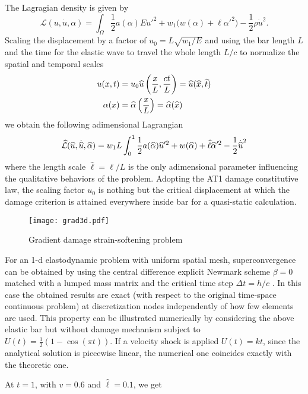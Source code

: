 The Lagragian density is given by
\[
\mathcal{L}(u,\dot{u},\alpha)=\int_\Omega\frac{1}{2}a(\alpha)Eu'^2+w_1\bigl(w(\alpha)+\ell\alpha'^2\bigr)-\frac{1}{2}\rho\dot{u}^2.
\]
Scaling the displacement by a factor of $u_0=L\sqrt{w_1/E}$ and using the bar length $L$ and the time for the elastic wave to travel the whole length $L/c$ to normalize the spatial and temporal scales
\begin{align}
u(x,t) &= u_0\widehat{u}\left(\frac{x}{L},\frac{ct}{L}\right)=\widehat{u}(\widehat{x},\widehat{t}) \label{eq:u} \\
\alpha(x) &= \widehat{\alpha}\left(\frac{x}{L}\right)=\widehat{\alpha}(\widehat{x})
\end{align}
we obtain the following adimensional Lagrangian
\begin{equation}
\widehat{\mathcal{L}}(\widehat{u},\dot{\widehat{u}},\widehat{\alpha})=w_1L\int_0^1\frac{1}{2}a(\widehat{\alpha})\widehat{u}'^2+w(\widehat{\alpha})+\widehat{\ell}\widehat{\alpha}'^2-\frac{1}{2}\dot{\widehat{u}}^2
\end{equation}
where the length scale $\widehat{\ell}=\ell/L$ is the only adimensional parameter influencing the qualitative behaviors of the problem. Adopting the AT1 damage constitutive law, the scaling factor $u_0$ is nothing but the critical displacement at which the damage criterion is attained everywhere inside bar for a quasi-static calculation.
\begin{figure}[htbp]
\centering
\texttt{[image: grad3d.pdf]}
\caption{Gradient damage strain-softening problem}
\end{figure}

For an 1-d elastodynamic problem with uniform spatial mesh, superconvergence can be obtained by using the central difference explicit Newmark scheme $\beta=0$ matched with a lumped mass matrix and the critical time step $\Delta t=h/c$ \cite{Hughes:2010}. In this case the obtained results are exact (with respect to the original time-space continuous problem) at discretization nodes independently of how few elements are used. This property can be illustrated numerically by considering the above elastic bar but without damage mechanism subject to $U(t)=\frac{1}{2}(1-\cos(\pi t))$. If a velocity shock is applied $U(t)=kt$, since the analytical solution is piecewise linear, the numerical one coincides exactly with the theoretic one.

At $t=1$, with $v=0.6$ and $\widehat{\ell}=0.1$, we get

